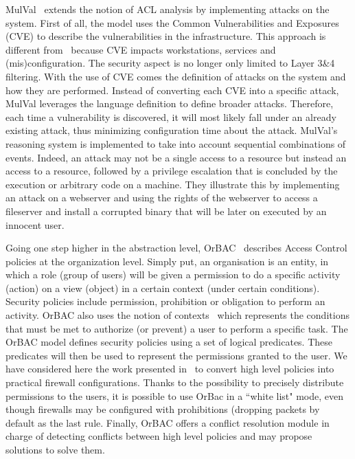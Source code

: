 MulVal~\cite{mulval-Ou2013} extends the notion of ACL analysis by implementing attacks on the system. 
First of all, the model uses the Common Vulnerabilities and Exposures (CVE) to describe the vulnerabilities in the infrastructure. This approach is different from~\cite{Matousek2008} because CVE impacts workstations, services and (mis)configuration. The security aspect is no longer only limited to  Layer 3\&4 filtering.
With the use of CVE comes the definition of attacks on the system and how they are performed.
Instead of converting each CVE into a specific attack, MulVal leverages the language definition to define broader attacks.
Therefore, each time a vulnerability is discovered, it will most likely fall under an already existing attack, thus minimizing configuration time about the attack.
MulVal's reasoning system is implemented to take into account sequential combinations of events.
Indeed, an attack may not be a single access to a resource but instead an access to a resource, followed by a privilege escalation that is concluded by the execution or arbitrary code on a machine.
They illustrate this by implementing an attack on a webserver and using the rights of the webserver to access a fileserver and install a corrupted binary that will be later on executed by an innocent user.

Going one step higher in the abstraction level, OrBAC~\cite{orbac} describes Access Control policies at the organization level. Simply put, an organisation is an entity, in which a role (\ie group of users) will be given a permission to do a specific activity (\ie action) on a view (\ie object) in a certain context (\ie under certain conditions).
Security policies include permission, prohibition or obligation to perform an activity.
OrBAC also uses the notion of contexts~\cite{context-orbac} which represents the conditions that must be met to authorize (or prevent) a user to perform a specific task.
The OrBAC model defines security policies using a set of logical predicates. These predicates will then be used to represent the permissions granted to the user.
We have considered here the work presented in~\cite{Cuppens} to convert high level policies into practical firewall configurations. Thanks to the possibility to precisely distribute permissions to the users, it is possible to use OrBac in a ``white list" mode, even though firewalls may be configured with prohibitions (\ie dropping packets by default as the last rule.
Finally, OrBAC offers a conflict resolution module in charge of detecting conflicts between high level policies and may propose solutions to solve them.

